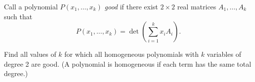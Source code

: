 Call a polynomial $ P(x_{1}, \ldots, x_{k})$ \textit{good} if there exist $ 2\times 2$ real matrices $ A_{1}, \ldots, A_{k}$ such that
\[P(x_{1}, \ldots, x_{k}) = \det \left(\sum_{i=1}^{k}x_{i}A_{i}\right).\]

Find all values of $ k$ for which all homogeneous polynomials with $ k$ variables of degree 2 are good. (A polynomial is homogeneous if each term has the same total degree.)
